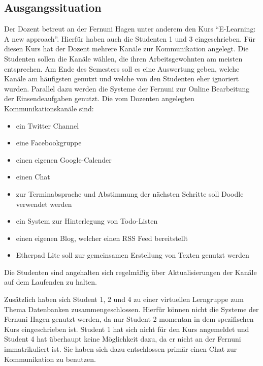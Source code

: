 \subsection{Ausgangssituation}\label{section:ausgangssituation}
Der Dozent betreut an der Fernuni Hagen unter anderem den Kurs "`E-Learning: A new approach"'. Hierfür haben auch die Studenten 1 und 3 eingeschrieben. Für diesen Kurs hat der Dozent mehrere Kanäle zur Kommunikation angelegt. Die Studenten sollen die Kanäle wählen, die ihren Arbeitsgewohnten am meisten entsprechen. Am Ende des Semesters soll es eine Auswertung geben, welche Kanäle am häufigsten genutzt und welche von den Studenten eher ignoriert wurden. Parallel dazu werden die Systeme der Fernuni zur Online Bearbeitung der Einsendeaufgaben genutzt. Die vom Dozenten angelegten Kommunikationskanäle sind:

\begin{itemize}
 \item ein Twitter Channel
 \item eine Facebookgruppe
 \item einen eigenen Google-Calender
 \item einen Chat
 \item zur Terminabsprache und Abstimmung der nächsten Schritte soll Doodle verwendet werden
 \item ein System zur Hinterlegung von Todo-Listen
 \item einen eigenen Blog, welcher einen RSS Feed bereitstellt 
 \item Etherpad Lite soll zur gemeinsamen Erstellung von Texten genutzt werden
\end{itemize}

Die Studenten sind angehalten sich regelmäßig über Aktualisierungen der Kanäle auf dem Laufenden zu halten.

Zusätzlich haben sich Student 1, 2 und 4 zu einer virtuellen Lerngruppe zum Thema Datenbanken zusammengeschlossen. Hierfür können nicht die Systeme der Fernuni Hagen genutzt werden, da nur Student 2 momentan in dem spezifischen Kurs eingeschrieben ist. Student 1 hat sich nicht für den Kurs angemeldet und Student 4 hat überhaupt keine Möglichkeit dazu, da er nicht an der Fernuni immatrikuliert ist. Sie haben sich dazu entschlossen primär einen Chat zur Kommunikation zu benutzen.

